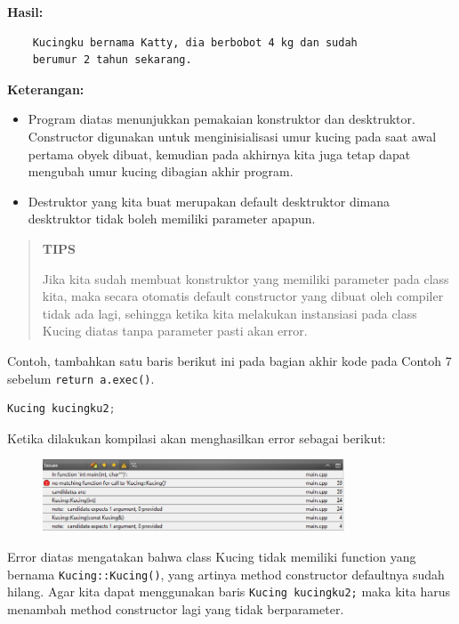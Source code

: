 \textbf{Hasil:}
\begin{lstlisting}
	Kucingku bernama Katty, dia berbobot 4 kg dan sudah
	berumur 2 tahun sekarang.
\end{lstlisting}
 

\textbf{Keterangan:}

\begin{itemize}
\tightlist
\item
  Program diatas menunjukkan pemakaian konstruktor dan desktruktor.
  Constructor digunakan untuk menginisialisasi umur kucing pada saat
  awal pertama obyek dibuat, kemudian pada akhirnya kita juga tetap
  dapat mengubah umur kucing dibagian akhir program.
\item
  Destruktor yang kita buat merupakan default desktruktor dimana
  desktruktor tidak boleh memiliki parameter apapun.
\end{itemize}

\begin{quotation}
	\textbf{TIPS} 
	
	Jika kita
	sudah membuat konstruktor yang memiliki parameter pada class kita, maka
	secara otomatis default constructor yang dibuat oleh compiler tidak ada
	lagi, sehingga ketika kita melakukan instansiasi pada class Kucing
	diatas tanpa parameter pasti akan error.
\end{quotation}


Contoh, tambahkan satu baris berikut ini pada bagian akhir kode pada
Contoh 7 sebelum \texttt{return\ a.exec()}.

\begin{lstlisting}[language=c++]
Kucing kucingku2;
\end{lstlisting}

Ketika dilakukan kompilasi akan menghasilkan error sebagai berikut:

\begin{figure}[htbp]
\centering
\includegraphics[width=0.8\textwidth]{images/capture6-2.png}
\caption{}
\end{figure}

Error diatas mengatakan bahwa class Kucing tidak memiliki function yang
bernama \texttt{Kucing::Kucing()}, yang artinya method constructor
defaultnya sudah hilang. Agar kita dapat menggunakan baris
\texttt{Kucing\ kucingku2;} maka kita harus menambah method constructor
lagi yang tidak berparameter.

